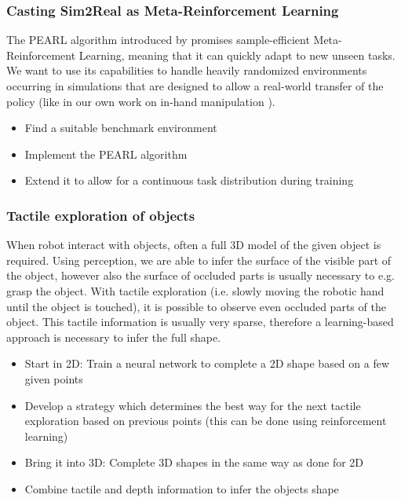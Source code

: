 \documentclass[a4paper]{article}
\begin{document}
\subsubsection{Casting Sim2Real as Meta-Reinforcement Learning}
The PEARL algorithm introduced by \cite{rakelly2019} promises sample-efficient Meta-Reinforcement Learning, meaning that it can quickly adapt to new unseen tasks. We want to use its capabilities to handle heavily randomized environments occurring in simulations that are designed to allow a real-world transfer of the policy (like in our own work on in-hand manipulation \cite{sievers2021}).
\begin{itemize}
  \item Find a suitable benchmark environment
  \item Implement the PEARL algorithm
  \item Extend it to allow for a continuous task distribution during training
\end{itemize}





\subsubsection{Tactile exploration of objects}

When robot interact with objects, often a full 3D model of the given object is required. 
Using perception, we are able to infer the surface of the visible part of the object, however also the surface of occluded parts is usually necessary to e.g. grasp the object.
With tactile exploration (i.e. slowly moving the robotic hand until the object is touched), it is possible to observe even occluded parts of the object.
This tactile information is usually very sparse, therefore a learning-based approach is necessary to infer the full shape.

\begin{itemize}
  \item Start in 2D: Train a neural network to complete a 2D shape based on a few given points \cite{watkins2019multi}
  \item Develop a strategy which determines the best way for the next tactile exploration based on previous points (this can be done using reinforcement learning)
  \item Bring it into 3D: Complete 3D shapes in the same way as done for 2D
  \item Combine tactile and depth information to infer the objects shape
\end{itemize}
\end{document}
